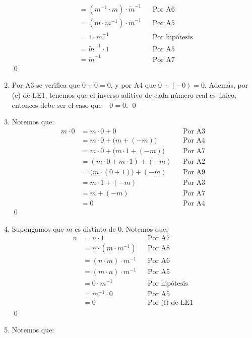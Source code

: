 \documentclass[11pt]{article}
\begin{document}
\begin{enumerate}[label=\alph*)]
\begin{align*}
        &= \left( m^{-1} \cdot m \right) \cdot \tilde{m} ^{-1} && \text{Por A6} \\
        &= \left(m \cdot m^{-1} \right) \cdot \tilde{m}^{-1} && \text{Por A5} \\
        &= 1 \cdot \tilde{m}^{-1} && \text{Por hipótesis} \\
        &= \tilde{m}^{-1} \cdot 1 && \text{Por A5} \\
        &= \tilde{m}^{-1} && \text{Por A7}
        \end{align*} \qed
    \item Por A3 se verifica que $0 + 0 = 0$, y por A4 que $0 + (-0) = 0$. Además, por (c) de LE1, tenemos que el inverso aditivo de cada número real es único, entonces debe ser el caso que $-0 = 0$. \qed
    \item Notemos que:
    \begin{align*}
        m\cdot0&=m\cdot0+0 && \text{Por A3}\\
        &=m\cdot0+\bigl(m+\left(-m\right)\bigr) && \text{Por A4}\\
        &=m\cdot0+\bigl(m\cdot1+\left(-m\right)\bigr) && \text{Por A7}\\
        &=\left(m\cdot0+m\cdot1\right)+\left(-m\right) && \text{Por A2}\\
        &=\bigl(m\cdot\left(0+1\right)\bigr)+\left(-m\right) && \text{Por A9}\\
        &=m\cdot1+\left(-m\right) && \text{Por A3}\\
        &=m+\left(-m\right) && \text{Por A7}\\
        &=0 && \text{Por A4}
    \end{align*} \qed
    \item Supongamos que $m$ es distinto de $0$. Notemos que:
    \begin{align*}
        n &= n \cdot 1	&& \text{Por A7} \\
        &= n \cdot  \left(m \cdot m^{-1}  \right) 	&& \text{Por A8} \\
        &= \left(n \cdot m \right)  \cdot m^{-1}	&& \text{Por A6} \\
        &= \left(m \cdot n \right)  \cdot m^{-1}	&& \text{Por A5} \\
        &= 0 \cdot m^{-1}	&& \text{Por hipótesis}\\
        &= m^{-1} \cdot 0	&& \text{Por A5}\\
        &= 0 && \text{Por (f) de LE1}
    \end{align*} \qed
    \item Notemos que: \begin{align*}

\end{align*}
\end{enumerate}
\end{document}
